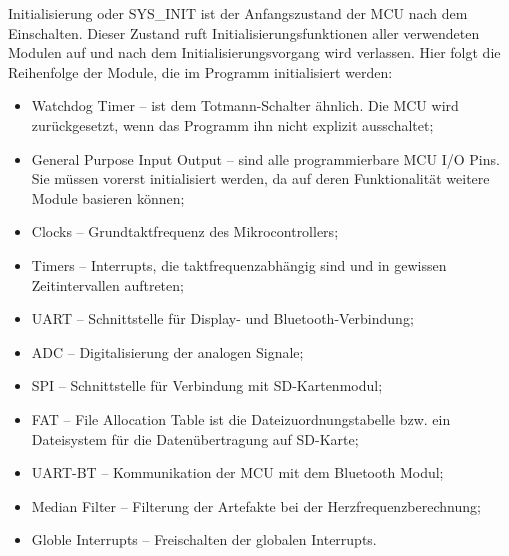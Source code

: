 Initialisierung oder SYS\_INIT ist der Anfangszustand der MCU nach dem Einschalten. Dieser Zustand ruft Initialisierungsfunktionen aller verwendeten Modulen auf und nach dem Initialisierungsvorgang wird verlassen. Hier folgt die Reihenfolge der Module, die im Programm initialisiert werden:
\begin{itemize}
    \item Watchdog Timer – ist dem Totmann-Schalter ähnlich. Die MCU wird zurückgesetzt, wenn das Programm ihn nicht explizit ausschaltet;
    \item General Purpose Input Output – sind alle programmierbare MCU I/O Pins. Sie müssen vorerst initialisiert werden, da auf deren Funktionalität weitere Module basieren können;
    \item Clocks – Grundtaktfrequenz des Mikrocontrollers;
    \item Timers – Interrupts, die taktfrequenzabhängig sind und in gewissen Zeitintervallen auftreten;
    \item UART – Schnittstelle für Display- und Bluetooth-Verbindung;
    \item ADC – Digitalisierung der analogen Signale;
    \item SPI – Schnittstelle für Verbindung mit SD-Kartenmodul;
    \item FAT – File Allocation Table ist die Dateizuordnungstabelle bzw. ein Dateisystem für die Datenübertragung auf SD-Karte;
    \item UART-BT – Kommunikation der MCU mit dem Bluetooth Modul;
    \item Median Filter – Filterung der Artefakte bei der Herzfrequenzberechnung;
    \item Globle Interrupts – Freischalten der globalen Interrupts.
\end{itemize}

